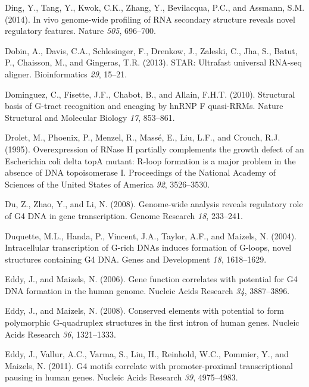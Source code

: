 \documentclass[12pt,a4paper,]{report}
\begin{document}
\leavevmode\hypertarget{ref-Ding2014}{}%
Ding, Y., Tang, Y., Kwok, C.K., Zhang, Y., Bevilacqua, P.C., and
Assmann, S.M. (2014). In vivo genome-wide profiling of RNA secondary
structure reveals novel regulatory features. Nature \emph{505},
696--700.

\leavevmode\hypertarget{ref-Dobin2013}{}%
Dobin, A., Davis, C.A., Schlesinger, F., Drenkow, J., Zaleski, C., Jha,
S., Batut, P., Chaisson, M., and Gingeras, T.R. (2013). STAR: Ultrafast
universal RNA-seq aligner. Bioinformatics \emph{29}, 15--21.

\leavevmode\hypertarget{ref-Dominguez2010}{}%
Dominguez, C., Fisette, J.F., Chabot, B., and Allain, F.H.T. (2010).
Structural basis of G-tract recognition and encaging by hnRNP F
quasi-RRMs. Nature Structural and Molecular Biology \emph{17}, 853--861.

\leavevmode\hypertarget{ref-Drolet1995}{}%
Drolet, M., Phoenix, P., Menzel, R., Massé, E., Liu, L.F., and Crouch,
R.J. (1995). Overexpression of RNase H partially complements the growth
defect of an Escherichia coli delta topA mutant: R-loop formation is a
major problem in the absence of DNA topoisomerase I. Proceedings of the
National Academy of Sciences of the United States of America \emph{92},
3526--3530.

\leavevmode\hypertarget{ref-Du2008}{}%
Du, Z., Zhao, Y., and Li, N. (2008). Genome-wide analysis reveals
regulatory role of G4 DNA in gene transcription. Genome Research
\emph{18}, 233--241.

\leavevmode\hypertarget{ref-Duquette2004}{}%
Duquette, M.L., Handa, P., Vincent, J.A., Taylor, A.F., and Maizels, N.
(2004). Intracellular transcription of G-rich DNAs induces formation of
G-loops, novel structures containing G4 DNA. Genes and Development
\emph{18}, 1618--1629.

\leavevmode\hypertarget{ref-Eddy2006}{}%
Eddy, J., and Maizels, N. (2006). Gene function correlates with
potential for G4 DNA formation in the human genome. Nucleic Acids
Research \emph{34}, 3887--3896.

\leavevmode\hypertarget{ref-Eddy2008}{}%
Eddy, J., and Maizels, N. (2008). Conserved elements with potential to
form polymorphic G-quadruplex structures in the first intron of human
genes. Nucleic Acids Research \emph{36}, 1321--1333.

\leavevmode\hypertarget{ref-Eddy2011}{}%
Eddy, J., Vallur, A.C., Varma, S., Liu, H., Reinhold, W.C., Pommier, Y.,
and Maizels, N. (2011). G4 motifs correlate with promoter-proximal
transcriptional pausing in human genes. Nucleic Acids Research
\emph{39}, 4975--4983.
\end{document}
